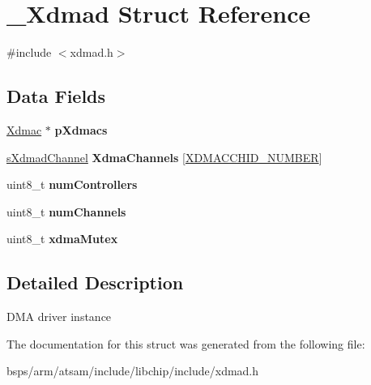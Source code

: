 \hypertarget{struct__Xdmad}{}\section{\+\_\+\+Xdmad Struct Reference}
\label{struct__Xdmad}


{\ttfamily \#include $<$xdmad.\+h$>$}

\subsection*{Data Fields}
\begin{DoxyCompactItemize}
\item 
\mbox{\label{struct__Xdmad_a0a6719ddf8dd9b626f7faef31f3dad11}} 
\mbox{\hyperlink{structXdmac}{Xdmac}} $\ast$ {\bfseries p\+Xdmacs}
\item 
\mbox{\label{struct__Xdmad_ad80b8059085ad876ca37fab78d81986e}} 
\mbox{\hyperlink{group__dmad__structs_ga822ea5147816d44b556f989a365c54b2}{s\+Xdmad\+Channel}} {\bfseries Xdma\+Channels} \mbox{[}\mbox{\hyperlink{group__SAMV71__XDMAC_gaaf818f6567ac43dc9885685b5d2fbda3}{X\+D\+M\+A\+C\+C\+H\+I\+D\+\_\+\+N\+U\+M\+B\+ER}}\mbox{]}
\item 
\mbox{\label{struct__Xdmad_a4e4e4944da83fcdc460012f4fd30fd65}} 
uint8\+\_\+t {\bfseries num\+Controllers}
\item 
\mbox{\label{struct__Xdmad_a690a9756a9bb1bfcb430f7143dd00518}} 
uint8\+\_\+t {\bfseries num\+Channels}
\item 
\mbox{\label{struct__Xdmad_a9cb8c2c8dc3c04a04ae6f5f9f225970f}} 
uint8\+\_\+t {\bfseries xdma\+Mutex}
\end{DoxyCompactItemize}


\subsection{Detailed Description}
D\+MA driver instance 

The documentation for this struct was generated from the following file\+:\begin{DoxyCompactItemize}
\item 
bsps/arm/atsam/include/libchip/include/xdmad.\+h\end{DoxyCompactItemize}
